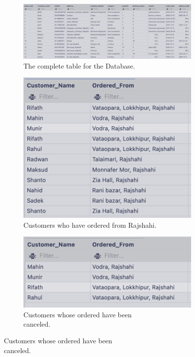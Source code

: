 \begin{figure}[H]
    \begin{subfigure}{1\textwidth}
        \centering
        \includegraphics[width=\linewidth]{images/output/fulltable.png}
        \caption{The complete table for the Database.}
        \label{fig:expo1}
    \end{subfigure}
    \begin{subfigure}{1\textwidth}
        \centering
        \includegraphics[width=.6\linewidth]{images/output/q3.png}
        \caption{Customers who have ordered from Rajshahi.}
        \label{fig:expo2}
    \end{subfigure}
    \vspace*{10mm}
    \begin{subfigure}{.5\textwidth}
        \centering
        \includegraphics[width=.8\linewidth]{images/output/q4.png}
        \caption[breakanywhere]{Customers whose ordered have been \\canceled.}
        \label{fig:expo3}

\end{subfigure}
\end{figure}
